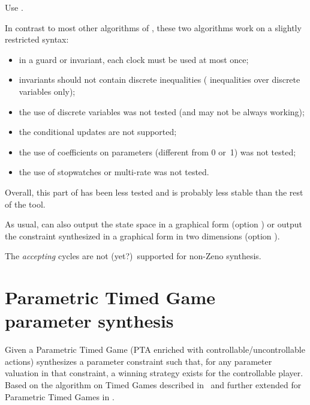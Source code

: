 	      Use .

\begin{becareful}[restrictions]
	In contrast to most other algorithms of \imitator{}, these two algorithms work on a slightly restricted syntax:
	\begin{itemize}
		\item in a guard or invariant, each clock must be used at most once;
		\item invariants should not contain discrete inequalities (\ie{} inequalities over discrete variables only);
		\item the use of discrete variables was not tested (and may not be always working);
		\item the conditional updates are not supported;
		\item the use of coefficients on parameters (different from 0 or~1) was not tested;
		\item the use of stopwatches or multi-rate was not tested.
	\end{itemize}
	Overall, this part of \imitator{} has been less tested and is probably less stable than the rest of the tool.
\end{becareful}

As usual, \imitator{} can also
output the state space in a graphical form (option )
or
output the constraint synthesized in a graphical form in two dimensions (option ).

\begin{remark}
	The \emph{accepting} cycles are not (yet?)\ supported for non-Zeno synthesis.
\end{remark}

\section{Parametric Timed Game parameter synthesis}\label{section:algorithm:ptg}
Given a Parametric Timed Game (PTA enriched with controllable/uncontrollable actions) synthesizes a parameter constraint such that, for any parameter valuation in that constraint, a winning strategy exists for the controllable player. Based on the algorithm on Timed Games described in~\cite{DBLP:conf/concur/CassezDFLL05} and further extended for Parametric Timed Games in \cite{DBLP:conf/wodes/JovanovicFLR12}.

